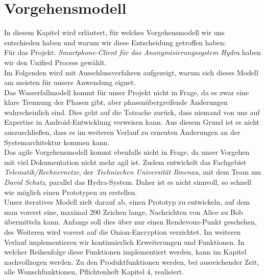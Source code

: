 \section{Vorgehensmodell}
In diesem Kapitel wird erläutert, für welches Vorgehensmodell wir uns entschieden haben und warum wir diese Entscheidung getroffen haben: \\ 

Für das Projekt: \textit{Smartphone-Client für das Anonymisierungssystem Hydra} haben wir den Unified Process gewählt.\\
Im Folgenden wird mit Ausschlussverfahren aufgezeigt, warum sich dieses Modell am meisten für unsere Anwendung eignet.\\ 

Das Wasserfallmodell kommt für unser Projekt nicht in Frage, da es zwar eine klare Trennung der Phasen gibt, aber phasenübergreifende Änderungen wahrscheinlich sind. Dies geht auf die Tatsache zurück, dass niemand von uns auf Expertise in Android-Entwicklung verweisen kann. Aus diesem Grund ist es nicht auszuschließen, dass es im weiteren Verlauf zu erneuten Änderungen an der Systemarchitektur kommen kann. \\ 

Das agile Vorgehensmodell kommt ebenfalls nicht in Frage, da unser Vorgehen mit viel Dokumentation nicht mehr agil ist. Zudem entwickelt das Fachgebiet \textit{Telematik/Rechnernetze}, der \textit{Technischen Universität Ilmenau}, mit dem Team um \textit{David Schatz},  parallel das Hydra-System. Daher ist es nicht sinnvoll, so schnell wie möglich einen Prototypen zu erstellen. \\ 

Unser iteratives Modell zielt darauf ab, einen Prototyp zu entwickeln, auf dem man vorerst eine, maximal 200 Zeichen lange, Nachrichten von Alice zu Bob übermitteln kann. Anfangs soll dies über nur einen Rendevouz-Punkt geschehen, des Weiteren wird vorerst auf die Onion-Encryption verzichtet. Im weiteren Verlauf implementieren wir kontinuierlich Erweiterungen und Funktionen. In welcher Reihenfolge diese Funktionen implementiert werden, kann im Kapitel  nachvollzogen werden. Zu den Produktfunktionen werden, bei ausreichender Zeit, alle Wunschfunktionen, Pflichtenheft Kapitel 4, realisiert.